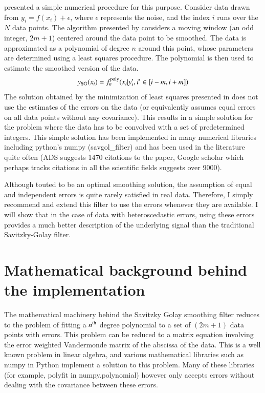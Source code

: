 \documentclass[iop, apj, onecolumn]{emulateapj}
\begin{document}
\citet{SG1964} presented a simple numerical procedure for this purpose. Consider
data drawn from $y_i=f(x_i)+\epsilon$, where $\epsilon$ represents the noise,
and the index $i$ runs over the $N$ data points. The algorithm presented by
\citet{SG1964} considers a moving window (an odd integer, $2m+1$) centered
around the data point to be smoothed. The data is approximated as a polynomial
of degree $n$ around this point, whose parameters are determined using a least
squares procedure. The polynomial is then used to estimate the smoothed version
of the data. 
\begin{equation}
        y_{\rm SG}(x_i) = f^{\rm poly}_{n}(x_i|{y_i', i'\in[i-m,i+m]})
\end{equation}
The solution obtained by the minimization of least squares presented in
\citet{SG1964} does not use the estimates of the errors on the data (or
equivalently assumes equal errors on all data points without any covariance).
This results in a simple solution for the problem where the data has to be
convolved with a set of predetermined integers. This simple solution has been
implemented in many numerical libraries including python's numpy
(savgol\_filter) and has been used in the literature quite often (ADS suggests
1470 citations to the paper, Google scholar which perhaps tracks citations in
all the scientific fields suggests over 9000).

Although touted to be an optimal smoothing solution, the assumption of equal and
independent errors is quite rarely satisfied in real data. Therefore, I simply
recommend and extend this filter to use the errors whenever they are available.
I will show that in the case of data with heteroscedastic errors, using these
errors provides a much better description of the underlying signal than the
traditional Savitzky-Golay filter.

\section{Mathematical background behind the implementation}

The mathematical machinery behind the Savitzky Golay smoothing filter reduces to
the problem of fitting a $n^{\rm th}$ degree polynomial to a set of $(2m+1)$
data points with errors. This problem can be reduced to a matrix equation
involving the error weighted Vandermonde matrix of the abscissa of the data.
This is a well known problem in linear algebra, and various mathematical
libraries such as numpy in Python implement a solution to this problem. Many
of these libraries (for example, polyfit in  numpy.polynomial) however only
accepts errors without dealing with the covariance between these errors.
\end{document}

